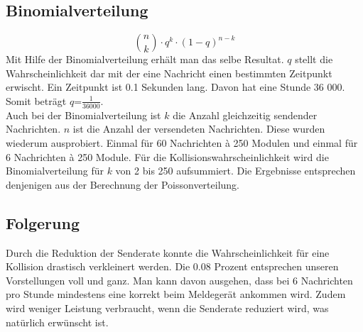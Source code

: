 \subsection{Binomialverteilung}

\begin{equation}
	{n\choose k}\cdot q^{k} \cdot(1-q)^{n-k}
\end{equation}
Mit Hilfe der Binomialverteilung erhält man das selbe Resultat. $q$ stellt die Wahrscheinlichkeit dar mit der eine Nachricht einen bestimmten Zeitpunkt erwischt. Ein Zeitpunkt ist 0.1 Sekunden lang. Davon hat eine Stunde 36 000. Somit beträgt $q$=$\frac{1}{36 000}$.
\\Auch bei der Binomialverteilung ist $k$ die Anzahl gleichzeitig sendender Nachrichten. $n$ ist die Anzahl der versendeten Nachrichten. Diese wurden wiederum ausprobiert. Einmal für 60 Nachrichten à 250 Modulen und einmal für 6 Nachrichten à 250 Module.
Für die Kollisionswahrscheinlichkeit wird die Binomialverteilung für $k$ von 2 bis 250 aufsummiert. Die Ergebnisse entsprechen denjenigen aus der Berechnung der Poissonverteilung.


\subsection{Folgerung}
Durch die Reduktion der Senderate konnte die Wahrscheinlichkeit für eine Kollision drastisch verkleinert werden. Die 0.08 Prozent entsprechen unseren Vorstellungen voll und ganz. Man kann davon ausgehen, dass bei 6 Nachrichten pro Stunde mindestens eine korrekt beim Meldegerät ankommen wird. Zudem wird weniger Leistung verbraucht, wenn die Senderate reduziert wird, was natürlich erwünscht ist.

